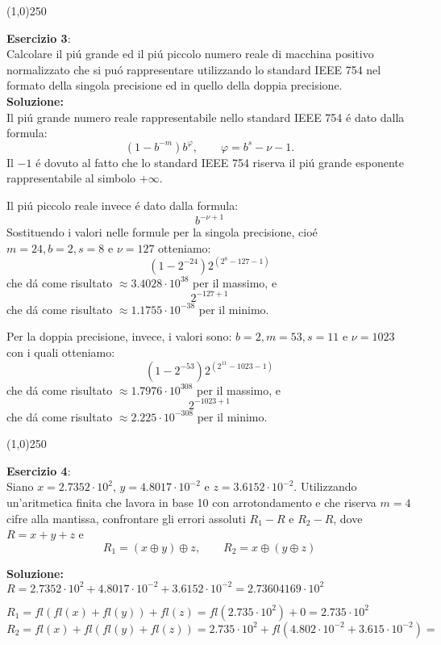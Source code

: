 \begin{center}
\line(1,0){250}
\end{center}

\textbf{Esercizio 3}:\\Calcolare il pi\'u grande ed il pi\'u piccolo numero
reale di macchina positivo normalizzato che si pu\'o rappresentare utilizzando
lo standard IEEE 754 nel formato della singola precisione ed in quello della
doppia precisione.\\

\textbf{Soluzione:}\\Il pi\'u grande numero reale rappresentabile nello
standard IEEE 754 \'e dato dalla formula:$$(1-b^{-m})b^\varphi,\qquad \varphi =
b^s - \nu - 1.$$ Il $-1$ \'e dovuto al fatto che lo standard IEEE 754 riserva il
pi\'u grande esponente rappresentabile al simbolo $+\infty$.

Il pi\'u piccolo reale invece \'e dato dalla formula:$$b^{-\nu + 1}$$
Sostituendo i valori nelle formule per la singola precisione,
cio\'e $m = 24 , b = 2 , s = 8$ e $\nu = 127$ otteniamo:
$$(1-2^{-24})2^{(2^{8}-127-1)}$$ che d\'a come risultato
$\approx3.4028\cdot10^{38}$ per il massimo, e $$2^{-127 + 1}$$ che  d\'a come
risultato $\approx1.1755\cdot10^{-38}$ per il minimo.

Per la doppia precisione, invece, i valori sono: $b = 2 , m = 53 , s = 11$ e
$\nu = 1023$ con i quali otteniamo:$$(1-2^{-53})2^{(2^{11}-1023-1)}$$ che d\'a
come risultato $\approx1.7976\cdot10^{308}$ per il massimo, e $$2^{-1023 + 1}$$
che d\'a come risultato $\approx2.225\cdot10^{-308}$ per il minimo.

\begin{center}
\line(1,0){250}
\end{center}

\textbf{Esercizio 4}:\\Siano $x=2.7352\cdot10^2$, $y=4.8017\cdot10^{-2}$ e
$z=3.6152\cdot10^{-2}$. Utilizzando un'aritmetica finita che lavora in base 10
con arrotondamento e che riserva $m=4$ cifre alla mantissa, confrontare gli
errori assoluti $R_1-R$ e $R_2-R$, dove $R=x+y+z$ e 
$$R_1=(x\oplus{y})\oplus{z}, \qquad R_2=x\oplus{(y\oplus{z})}$$ 

\textbf{Soluzione:}\\$R = 2.7352 \cdot 10^2 + 4.8017 \cdot 10^{-2} +
3.6152 \cdot 10^{-2} = 2.73604169 \cdot 10^{2}$

$R_1 = fl(fl(x)+fl(y))+fl(z)
= fl(2.735 \cdot 10^{2}) + 0 = 2.735 \cdot 10^{2}$
$R_2 =fl(x)+fl(fl(y)+fl(z)) = 2.735 \cdot 10^2+fl(4.802 \cdot 10^{-2}+3.615
\cdot 10^{-2}) =$ 

